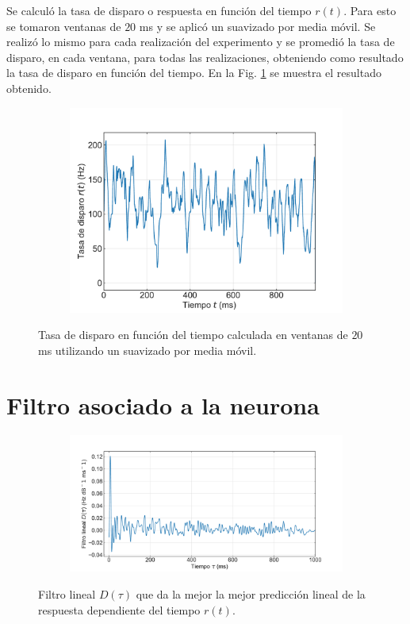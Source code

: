 \documentclass[11pt,twocolumn,twoside]{opticajnl}
\begin{document}
Se calculó la tasa de disparo o respuesta en función del tiempo $r(t)$. Para esto se tomaron ventanas de $20$ ms y se aplicó un suavizado por media móvil. Se realizó lo mismo para cada realización del experimento y se promedió la tasa de disparo, en cada ventana, para todas las realizaciones, obteniendo como resultado la tasa de disparo en función del tiempo. En la Fig. \ref{fig:tasadedisparo} se muestra el resultado obtenido.

\begin{figure}[ht]
    \centering
         \begin{subfigure}[b]{\linewidth}
            \includegraphics[width=\textwidth]{Figuras/tasa_disparo.pdf}
         \end{subfigure}
    \caption{Tasa de disparo en función del tiempo calculada en ventanas de $20$ ms utilizando un suavizado por media móvil.} 
    \label{fig:tasadedisparo}
\end{figure}

\section{Filtro asociado a la neurona}

\begin{figure}[ht]
    \centering
            \begin{subfigure}[b]{\linewidth}
            \includegraphics[width=\textwidth]{Figuras/filtro_lineal.pdf}
            \end{subfigure}
    \caption{Filtro lineal $D(\tau)$ que da la mejor la mejor predicción lineal de la respuesta dependiente del tiempo $r(t)$.} 
    \label{fig:filtrolineal}
\end{figure}
\end{document}
